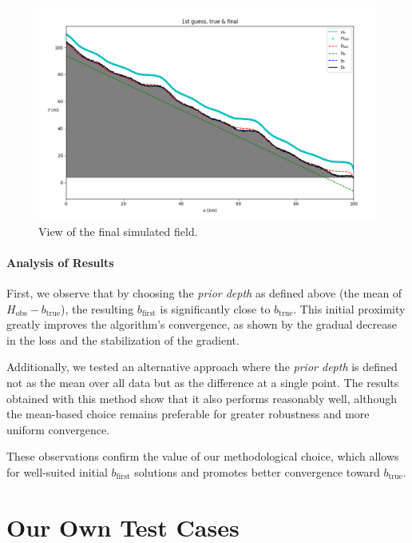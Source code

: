 \documentclass{article}
\begin{document}
\begin{figure}[H]
    \vspace{0.5cm}
    
    \begin{minipage}[b]{0.8\linewidth}
        \centering
        \includegraphics[width=\linewidth]{Images_Ayoub/h_connue/View.png}
        \caption{View of the final simulated field.}
        \label{fig:hconnue-view}
    \end{minipage}
\end{figure}

\paragraph{Analysis of Results}
First, we observe that by choosing the \emph{prior depth} as defined above (the mean of \( H_{\text{obs}} - b_{\text{true}} \)), the resulting \( b_{\text{first}} \) is significantly close to \( b_{\text{true}} \). This initial proximity greatly improves the algorithm's convergence, as shown by the gradual decrease in the loss and the stabilization of the gradient.

Additionally, we tested an alternative approach where the \emph{prior depth} is defined not as the mean over all data but as the difference at a single point. The results obtained with this method show that it also performs reasonably well, although the mean-based choice remains preferable for greater robustness and more uniform convergence.

These observations confirm the value of our methodological choice, which allows for well-suited initial \( b_{\text{first}} \) solutions and promotes better convergence toward \( b_{\text{true}} \).

\section{Our Own Test Cases}
\end{document}
